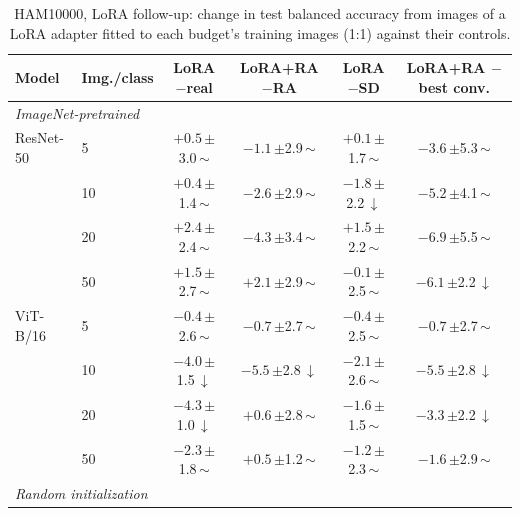 \begin{table}[htbp]
\centering
\footnotesize
\setlength{\tabcolsep}{4pt}
\caption{HAM10000, LoRA follow-up: change in test balanced accuracy from images of a LoRA adapter fitted to each budget's training images (1:1) against their controls.}
\label{tab:paper-ham10000-lora}
\begin{tabular}{llcccc}
\toprule
Model & Img./class & \shortstack{LoRA\\$-$real} & \shortstack{LoRA+RA\\$-$RA} & \shortstack{LoRA\\$-$SD} & \shortstack{LoRA+RA\\$-$best conv.} \\
\midrule
\multicolumn{6}{l}{\textit{ImageNet-pretrained}} \\
ResNet-50 & 5 & $+0.5$\,{\scriptsize$\pm$3.0}\,$\sim$ & $-1.1$\,{\scriptsize$\pm$2.9}\,$\sim$ & $+0.1$\,{\scriptsize$\pm$1.7}\,$\sim$ & $-3.6$\,{\scriptsize$\pm$5.3}\,$\sim$ \\
 & 10 & $+0.4$\,{\scriptsize$\pm$1.4}\,$\sim$ & $-2.6$\,{\scriptsize$\pm$2.9}\,$\sim$ & $-1.8$\,{\scriptsize$\pm$2.2}\,$\downarrow$ & $-5.2$\,{\scriptsize$\pm$4.1}\,$\sim$ \\
 & 20 & $+2.4$\,{\scriptsize$\pm$2.4}\,$\sim$ & $-4.3$\,{\scriptsize$\pm$3.4}\,$\sim$ & $+1.5$\,{\scriptsize$\pm$2.2}\,$\sim$ & $-6.9$\,{\scriptsize$\pm$5.5}\,$\sim$ \\
 & 50 & $+1.5$\,{\scriptsize$\pm$2.7}\,$\sim$ & $+2.1$\,{\scriptsize$\pm$2.9}\,$\sim$ & $-0.1$\,{\scriptsize$\pm$2.5}\,$\sim$ & $-6.1$\,{\scriptsize$\pm$2.2}\,$\downarrow$ \\
\addlinespace[2pt]
ViT-B/16 & 5 & $-0.4$\,{\scriptsize$\pm$2.6}\,$\sim$ & $-0.7$\,{\scriptsize$\pm$2.7}\,$\sim$ & $-0.4$\,{\scriptsize$\pm$2.5}\,$\sim$ & $-0.7$\,{\scriptsize$\pm$2.7}\,$\sim$ \\
 & 10 & $-4.0$\,{\scriptsize$\pm$1.5}\,$\downarrow$ & $-5.5$\,{\scriptsize$\pm$2.8}\,$\downarrow$ & $-2.1$\,{\scriptsize$\pm$2.6}\,$\sim$ & $-5.5$\,{\scriptsize$\pm$2.8}\,$\downarrow$ \\
 & 20 & $-4.3$\,{\scriptsize$\pm$1.0}\,$\downarrow$ & $+0.6$\,{\scriptsize$\pm$2.8}\,$\sim$ & $-1.6$\,{\scriptsize$\pm$1.5}\,$\sim$ & $-3.3$\,{\scriptsize$\pm$2.2}\,$\downarrow$ \\
 & 50 & $-2.3$\,{\scriptsize$\pm$1.8}\,$\sim$ & $+0.5$\,{\scriptsize$\pm$1.2}\,$\sim$ & $-1.2$\,{\scriptsize$\pm$2.3}\,$\sim$ & $-1.6$\,{\scriptsize$\pm$2.9}\,$\sim$ \\
\midrule
\multicolumn{6}{l}{\textit{Random initialization}} \\

\end{tabular}
\end{table}
